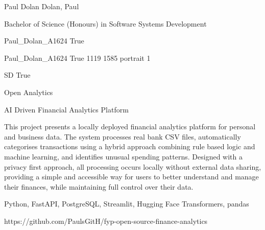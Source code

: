 \documentclass[twoside]{report}
\begin{document}
\begingroup{}\relax



\def\Key{Paul_Dolan_A1624}

{Paul Dolan}
{Dolan, Paul}

{Bachelor of Science (Honours) in Software Systems Development}

{Paul_Dolan_A1624}
{True}

{Paul_Dolan_A1624}
{True}
{1119}
{1585}
{portrait}
{1}

{SD}
{True}

{Open Analytics}

{AI Driven Financial Analytics Platform}

{This project presents a locally deployed financial analytics platform for personal and business data. The system processes real bank CSV files, automatically categorises transactions using a hybrid approach combining rule based logic and machine learning, and identifies unusual spending patterns. Designed with a privacy first approach, all processing occurs locally without external data sharing, providing a simple and accessible way for users to better understand and manage their finances, while maintaining full control over their data.}

{Python, FastAPI, PostgreSQL, Streamlit, Hugging Face Transformers, pandas}

{https://github.com/PaulsGitH/fyp-open-source-finance-analytics}
\end{document}
